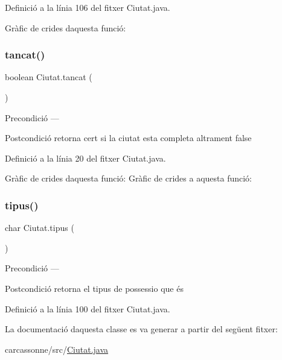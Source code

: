 Definició a la línia 106 del fitxer Ciutat.\+java.

Gràfic de crides d\textquotesingle{}aquesta funció\+:
\mbox{\label{class_ciutat_a427646d0239bb076543505a4d52772c2}} 
\subsubsection{\texorpdfstring{tancat()}{tancat()}}
{\footnotesize\ttfamily boolean Ciutat.\+tancat (\begin{DoxyParamCaption}{ }\end{DoxyParamCaption})}

\begin{DoxyPrecond}{Precondició}
--- 
\end{DoxyPrecond}
\begin{DoxyPostcond}{Postcondició}
retorna cert si la ciutat esta completa altrament false 
\end{DoxyPostcond}


Definició a la línia 20 del fitxer Ciutat.\+java.

Gràfic de crides d\textquotesingle{}aquesta funció\+:
Gràfic de crides a aquesta funció\+:
\mbox{\label{class_ciutat_a3b3c22ebac4fc2ce26417016f9665cfe}} 
\subsubsection{\texorpdfstring{tipus()}{tipus()}}
{\footnotesize\ttfamily char Ciutat.\+tipus (\begin{DoxyParamCaption}{ }\end{DoxyParamCaption})}

\begin{DoxyPrecond}{Precondició}
--- 
\end{DoxyPrecond}
\begin{DoxyPostcond}{Postcondició}
retorna el tipus de possessio que és 
\end{DoxyPostcond}


Definició a la línia 100 del fitxer Ciutat.\+java.



La documentació d\textquotesingle{}aquesta classe es va generar a partir del següent fitxer\+:\begin{DoxyCompactItemize}
\item 
carcassonne/src/\mbox{\hyperlink{_ciutat_8java}{Ciutat.\+java}}\end{DoxyCompactItemize}
